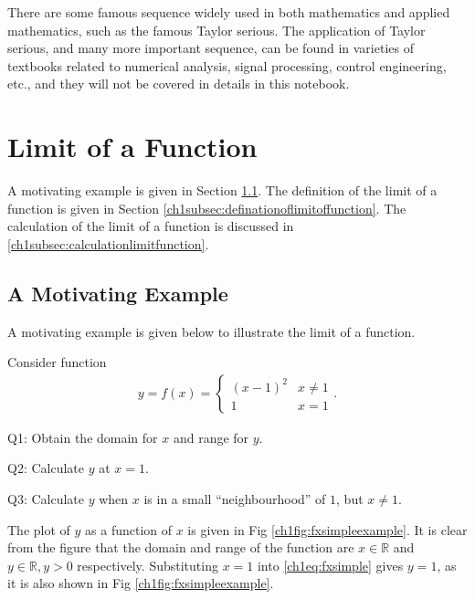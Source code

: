 There are some famous sequence widely used in both mathematics and applied mathematics, such as the famous Taylor serious. The application of Taylor serious, and many more important sequence, can be found in varieties of textbooks related to numerical analysis, signal processing, control engineering, etc., and they will not be covered in details in this notebook.

\section{Limit of a Function} \label{ch1sec:limitofafunction}

A motivating example is given in Section \ref{ch1subsec:functionmotivatingexample}. The definition of the limit of a function is given in Section \ref{ch1subsec:definationoflimitoffunction}. The calculation of the limit of a function is discussed in \ref{ch1subsec:calculationlimitfunction}.

\subsection{A Motivating Example} \label{ch1subsec:functionmotivatingexample}

A motivating example is given below to illustrate the limit of a function.

\begin{shortbox}

Consider function
\begin{eqnarray}
  y = f(x) = \left\{\begin{array}{cc}
                    (x-1)^2 & x \neq 1 \\
                    1 & x = 1
                  \end{array}\right.. \label{ch1eq:fxsimple}
\end{eqnarray}

Q1: Obtain the domain for $x$ and range for $y$.

Q2: Calculate $y$ at $x = 1$.

Q3: Calculate $y$ when $x$ is in a small ``neighbourhood'' of $1$, but $x \neq 1$.

\end{shortbox}

The plot of $y$ as a function of $x$ is given in Fig \ref{ch1fig:fxsimpleexample}. It is clear from the figure that the domain and range of the function are $x\in \mathbb{R}$ and $y\in \mathbb{R}, y > 0$ respectively. Substituting $x=1$ into \eqref{ch1eq:fxsimple} gives $y=1$, as it is also shown in Fig \ref{ch1fig:fxsimpleexample}.

